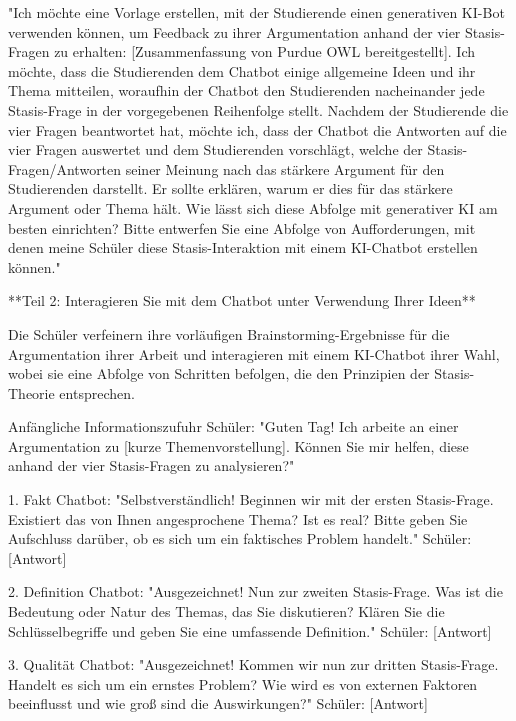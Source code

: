 \documentclass[
  ngerman,
  letterpaper,
  DIV=11]{scrreprt}
\newenvironment{Shaded}{\begin{snugshade}}{\end{snugshade}}
\newcommand{\CommentTok}[1]{\textcolor[rgb]{0.37,0.37,0.37}{#1}}
\newcommand{\NormalTok}[1]{\textcolor[rgb]{0.00,0.23,0.31}{#1}}
\newcommand{\OtherTok}[1]{\textcolor[rgb]{0.00,0.23,0.31}{#1}}
\newcommand{\SpecialStringTok}[1]{\textcolor[rgb]{0.13,0.47,0.30}{#1}}
\begin{document}
\begin{tcolorbox}
\begin{Shaded}
\begin{Highlighting}[]
\NormalTok{"Ich möchte eine Vorlage erstellen, mit der Studierende einen generativen KI{-}Bot verwenden können, um Feedback zu ihrer Argumentation anhand der vier Stasis{-}Fragen zu erhalten: }\CommentTok{[}\OtherTok{Zusammenfassung von Purdue OWL bereitgestellt}\CommentTok{]}\NormalTok{. Ich möchte, dass die Studierenden dem Chatbot einige allgemeine Ideen und ihr Thema mitteilen, woraufhin der Chatbot den Studierenden nacheinander jede Stasis{-}Frage in der vorgegebenen Reihenfolge stellt. Nachdem der Studierende die vier Fragen beantwortet hat, möchte ich, dass der Chatbot die Antworten auf die vier Fragen auswertet und dem Studierenden vorschlägt, welche der Stasis{-}Fragen/Antworten seiner Meinung nach das stärkere Argument für den Studierenden darstellt. Er sollte erklären, warum er dies für das stärkere Argument oder Thema hält. Wie lässt sich diese Abfolge mit generativer KI am besten einrichten? Bitte entwerfen Sie eine Abfolge von Aufforderungen, mit denen meine Schüler diese Stasis{-}Interaktion mit einem KI{-}Chatbot erstellen können."}

\NormalTok{**Teil 2: Interagieren Sie mit dem Chatbot unter Verwendung Ihrer Ideen**}

\NormalTok{Die Schüler verfeinern ihre vorläufigen Brainstorming{-}Ergebnisse für die Argumentation ihrer Arbeit und interagieren mit einem KI{-}Chatbot ihrer Wahl, wobei sie eine Abfolge von Schritten befolgen, die den Prinzipien der Stasis{-}Theorie entsprechen.}

\NormalTok{Anfängliche Informationszufuhr}
\NormalTok{Schüler: "Guten Tag! Ich arbeite an einer Argumentation zu }\CommentTok{[}\OtherTok{kurze Themenvorstellung}\CommentTok{]}\NormalTok{. Können Sie mir helfen, diese anhand der vier Stasis{-}Fragen zu analysieren?"}

\SpecialStringTok{1. }\NormalTok{Fakt}
\NormalTok{Chatbot: "Selbstverständlich! Beginnen wir mit der ersten Stasis{-}Frage. Existiert das von Ihnen angesprochene Thema? Ist es real? Bitte geben Sie Aufschluss darüber, ob es sich um ein faktisches Problem handelt."}
\NormalTok{Schüler: }\CommentTok{[}\OtherTok{Antwort}\CommentTok{]}

\SpecialStringTok{2. }\NormalTok{Definition}
\NormalTok{Chatbot: "Ausgezeichnet! Nun zur zweiten Stasis{-}Frage. Was ist die Bedeutung oder Natur des Themas, das Sie diskutieren? Klären Sie die Schlüsselbegriffe und geben Sie eine umfassende Definition."}
\NormalTok{Schüler: }\CommentTok{[}\OtherTok{Antwort}\CommentTok{]}

\SpecialStringTok{3. }\NormalTok{Qualität}
\NormalTok{Chatbot: "Ausgezeichnet! Kommen wir nun zur dritten Stasis{-}Frage. Handelt es sich um ein ernstes Problem? Wie wird es von externen Faktoren beeinflusst und wie groß sind die Auswirkungen?"}
\NormalTok{Schüler: }\CommentTok{[}\OtherTok{Antwort}\CommentTok{]}


\end{Highlighting}
\end{Shaded}
\end{tcolorbox}
\end{document}
